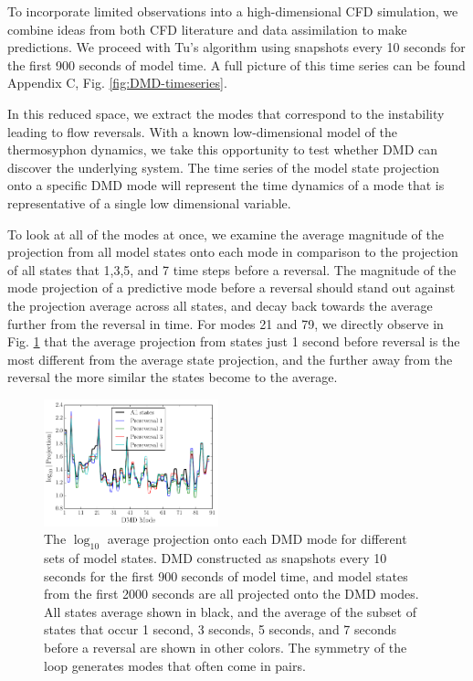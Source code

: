 To incorporate limited observations into a high-dimensional CFD simulation, we combine ideas from both CFD literature and data assimilation to make predictions.
We proceed with Tu's algorithm using snapshots every 10 seconds for the first 900 seconds of model time.
A full picture of this time series can be found Appendix C, Fig. \ref{fig:DMD-timeseries}.

In this reduced space, we extract the modes that correspond to the instability leading to flow reversals.
With a known low-dimensional model of the thermosyphon dynamics, we take this opportunity to test whether DMD can discover the underlying system.
The time series of the model state projection onto a specific DMD mode will represent the time dynamics of a mode that is representative of a single low dimensional variable.

To look at all of the modes at once, we examine the average magnitude of the projection from all model states onto each mode in comparison to the projection of all states that 1,3,5, and 7 time steps before a reversal.
The magnitude of the mode projection of a predictive mode before a reversal should stand out against the projection average across all states, and decay back towards the average further from the reversal in time.
For modes 21 and 79, we directly observe in Fig. \ref{fig:DMD_modes} that the average projection from states just 1 second before reversal is the most different from the average state projection, and the further away from the reversal the more similar the states become to the average.

\begin{figure}[h]
  \centering
  \includegraphics[width=0.45\textwidth]{../figures/2015-10-02-12-51-DMD_modes_pre_reversals.pdf}
  \caption[]{
    The $\log_{10}$ average projection onto each DMD mode for different sets of model states.
    DMD constructed as snapshots every 10 seconds for the first 900 seconds of model time, and model states from the first 2000 seconds are all projected onto the DMD modes.
    All states average shown in black, and the average of the subset of states that occur 1 second, 3 seconds, 5 seconds, and 7 seconds before a reversal are shown in other colors.
    The symmetry of the loop generates modes that often come in pairs.
      }
  \label{fig:DMD_modes}
\end{figure}

